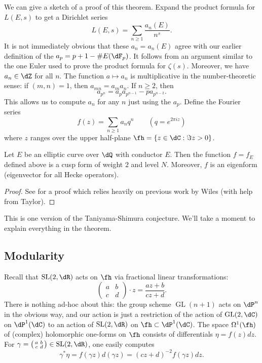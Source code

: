 We can give a sketch of a proof of this theorem. Expand the product formula for 
$L(E,s)$ to get a Dirichlet series 
\[
  L(E,s) = \sum_{n\geqslant 1} \frac{a_n(E)}{n^s} \text{.}
\]
It is not immediately obvious that these $a_n=a_n(E)$ agree with our earlier 
definition of the $a_p=p+1-\# E(\dF_p)$. It follows from an argument similar to 
the one Euler used to prove the product formula for $\zeta(s)$. Moreover, we 
have $a_n\in \dZ$ for all $n$. The function 
$a\mapsto a_n$ is multiplicative in the number-theoretic sense: if 
$(m,n)=1$, then $a_{mn}=a_m a_n$. If $n\geqslant 2$, then 
\[
  a_{p^n} = a_p a_{p^{n-1}} - p a_{p^{n-2}} \text{.}
\]
This allows us to compute $a_n$ for any $n$ just using the $a_p$. Define the 
Fourier series 
\[
  f(z) = \sum_{n\geqslant 1} a_n q^n \qquad (q=e^{2\pi i z})
\]
where $z$ ranges over the upper half-plane $\fh=\{z\in \dC:\Im z>0\}$. 

\begin{theorem}\label{thm:fermat-wiles}
Let $E$ be an elliptic curve over $\dQ$ with conductor $E$. Then the function 
$f=f_E$ defined above is a cusp form of weight $2$ and level $N$. Moreover, 
$f$ is an eigenform (eigenvector for all Hecke operators). 
\end{theorem}
\begin{proof}
See \cite{bcdt01} for a proof which relies heavily on previous work by 
Wiles (with help from Taylor).
\end{proof}
This is one version of the Taniyama-Shimura conjecture. We'll take a moment to 
explain everything in the theorem. 





\subsection{Modularity}

Recall that $\operatorname{SL}(2,\dR)$ acts 
on $\fh$ via fractional linear transformations:
\[
  \begin{pmatrix} a & b \\ c & d\end{pmatrix}\cdot z = \frac{a z+b}{c z+d} \text{.}
\]
There is nothing ad-hoc about this: the group scheme 
$\operatorname{GL}(n+1)$ acts on $\dP^n$ in the obvious way, and our action is 
just a restriction of the action of $\gl{2}{\dC}$ on $\dP^1(\dC)$ 
to an action of $\operatorname{SL}(2,\dR)$ on $\fh\subset \dP^1(\dC)$. 
The space $\Omega^1(\fh)$ of (complex) holomorphic one-forms on $\fh$ consists of 
differentials $\eta=f(z)dz$. For 
$\gamma=\smat a b c d\in \operatorname{SL}(2,\dR)$, one easily computes 
\[
  \gamma^\ast \eta = f(\gamma z)d(\gamma z) = (c z+d)^{-2}f(\gamma z) dz \text{.}
\]

